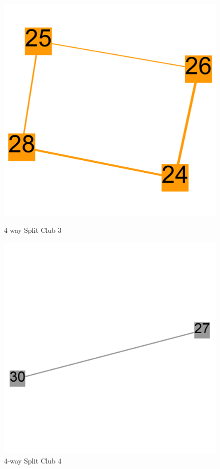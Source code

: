 \documentclass[paper=a4, fontsize=11pt]{scrartcl} %
\numberwithin{equation}{section} %
\numberwithin{figure}{section} %
\numberwithin{table}{section} %
\begin{document}
\begin{figure}[H]
\centering
\begin{minipage}{.5\textwidth}
  \centering
\includegraphics[width=1\textwidth]{4clubs/club3}
\caption{4-way Split Club 3}
\label{fig:4clubs3}
\end{minipage}%
\begin{minipage}{.5\textwidth}
  \centering
\includegraphics[width=1\textwidth]{4clubs/club4}
\caption{4-way Split Club 4}
\label{fig:4clubs4}
\end{minipage}
\end{figure}
\end{document}
